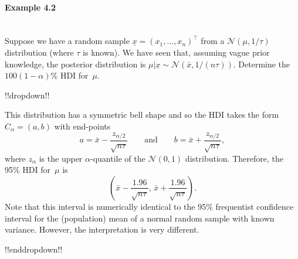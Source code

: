 \paragraph{Example 4.2}{~\\
Suppose we have a random sample $\underline{x} = (x_1, \ldots, x_n)^\top$ from a $\mathcal{N}(\mu,1/\tau)$
distribution (where $\tau$ is known). We have seen that, assuming
vague prior knowledge, the posterior distribution is $\mu|\underline{x}\sim
\mathcal{N}(\bar x,1/(n\tau))$. Determine the $100(1-\alpha)\%$ HDI for~$\mu$.

!!dropdown!!

This distribution has a symmetric bell shape and so the HDI takes the
    form $C_\alpha=(a,b)$ with end-points
    $$
    a=\bar x - \frac{z_{\alpha/2}}{\sqrt{n\tau}}
    \quad\quad\text{and}\quad\quad
    b=\bar x + \frac{z_{\alpha/2}}{\sqrt{n\tau}},
    $$
    where $z_\alpha$ is the upper $\alpha$-quantile of the $\mathcal{N}(0,1)$
    distribution. Therefore, the 95\% HDI for~$\mu$ is 
    $$
    \left(\bar x - \frac{1.96}{\sqrt{n\tau}},\,
    \bar x + \frac{1.96}{\sqrt{n\tau}}\right).
    $$ 
    Note that this interval is numerically identical to the 95\% frequentist confidence interval for the (population) mean of a normal random sample with known variance. However, the interpretation is very
    different.

!!enddropdown!!}



